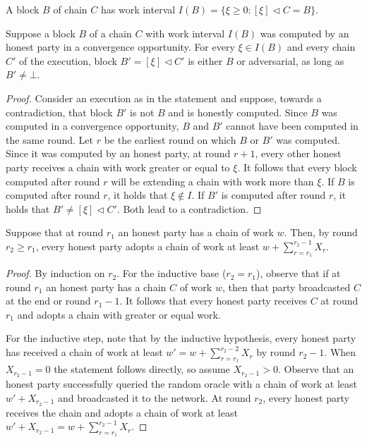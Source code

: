 \begin{definition}
  A block $B$ of chain $C$ has work interval
  $I(B) = \{\xi \geq 0: [\xi] \lhd C = B\}$.
\end{definition}


\begin{lemma}
  Suppose a block $B$ of a chain $C$ with work interval $I(B)$
  was computed by an honest party in a convergence opportunity.
  For every $\xi \in I(B)$ and every chain $C'$ of the execution,
  block $B' = [\xi] \lhd C'$ is either $B$ or adversarial,
  as long as $B' \neq \bot$.
\end{lemma}
\begin{proof}
  Consider an execution as in the statement and suppose, towards a contradiction,
  that block $B'$ is not $B$ and is honestly computed.
  Since $B$ was computed in a convergence opportunity, $B$ and $B'$
  cannot have been computed in the same round. Let $r$ be the earliest round
  on which $B$ or $B'$ was computed. Since it was computed by
  an honest party, at round $r + 1$, every other honest party receives
  a chain with work greater or equal to $\xi$.
  It follows that every block computed
  after round $r$ will be extending a chain with work more than $\xi$.
  If $B$ is computed after round $r$, it holds that $\xi \not \in I$.
  If $B'$ is computed after round $r$, it holds that $B' \neq [\xi] \lhd C'$.
  Both lead to a contradiction. \Qed
\end{proof}

\begin{lemma}
  Suppose that at round $r_1$ an honest party has a chain of work $w$.
  Then, by round $r_2 \geq r_1$, every honest party adopts a chain of work at least
  $w + \sum_{r = r_1}^{r_2 - 1}{X_r}$.
\end{lemma}
\begin{proof}
  By induction on $r_2$. For the inductive base ($r_2 = r_1$), observe that
  if at round $r_1$ an honest party has a chain $C$ of work $w$, then
  that party broadcasted $C$ at the end or round $r_1 - 1$. It follows that
  every honest party receives $C$ at round $r_1$ and adopts a chain with
  greater or equal work.

  For the inductive step, note that by the inductive hypothesis,
  every honest party has received a chain of work at least $w' = w + \sum_{r = r_1}^{r_2 - 2}{X_r}$
  by round $r_2 - 1$. When $X_{r_2 - 1} = 0$ the statement follows directly, so assume
  $X_{r_2 - 1} > 0$. Observe that an honest party successfully queried the random oracle
  with a chain of work at least $w' + X_{r_2 - 1}$ and broadcasted it to the network.
  At round $r_2$, every honest party receives the chain and adopts a chain
  of work at least $w' + X_{r_2 - 1} = w + \sum_{r = r_1}^{r_2 - 1}{X_r}$. \Qed
\end{proof}



